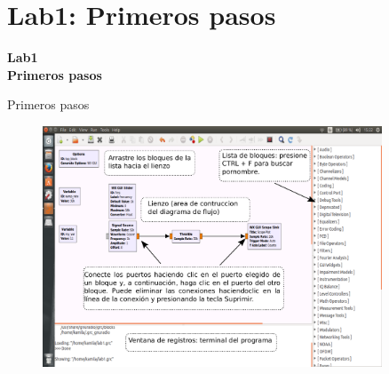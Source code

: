 

\section{Lab1: Primeros pasos}
\begin{frame}{}


\bfseries{\textrm{\LARGE Lab1\\ \Large Primeros pasos}}
\raggedright
\end{frame}

\begin{frame}{Primeros pasos}


\begin{figure}[H]
\centering
\vspace{-3mm}
\includegraphics[width=0.9\textwidth]{lab1/pdf/lab1_1.pdf}
\end{figure}
\end{frame}

